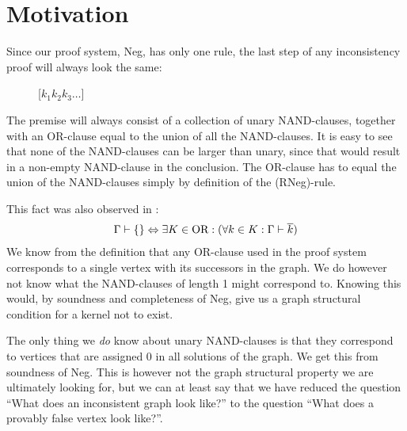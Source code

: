 \section{Motivation}
\label{sec:Motivation}
Since our proof system, Neg, has only one rule, the last step of any inconsistency proof will always look the same:\par
\begin{figure}[!h]
  \centering
  \begin{prooftree*}
    \Hypo{\dots}
    [$k_1k_2k_3\dots$]{\varnothing}
  \end{prooftree*}
  \caption{}
  \label{fig:proof_unary_nand}
\end{figure}
The premise will always consist of a collection of unary NAND-clauses, together with an OR-clause equal to the union of all the NAND-clauses.
It is easy to see that none of the NAND-clauses can be larger than unary, since that would result in a non-empty NAND-clause in the conclusion.
The OR-clause has to equal the union of the NAND-clauses simply by definition of the (RNeg)-rule.

This fact was also observed in \cite{michal-completeness}:
\begin{align}
  \Gamma \vdash \{\} \Leftrightarrow \exists K \in \text{OR}: (\forall  k \in K: \Gamma \vdash \ol{k})
\end{align}
We know from the definition that any OR-clause used in the proof system corresponds to a single vertex with its successors in the graph.
We do however not know what the NAND-clauses of length 1 might correspond to.
Knowing this would, by soundness and completeness of Neg, give us a graph structural condition for a kernel not to exist.

The only thing we \textit{do} know about unary NAND-clauses is that they correspond to vertices that are assigned 0 in all solutions of the graph.
We get this from soundness of Neg.
This is however not the graph structural property we are ultimately looking for, but we can at least say that we have reduced the question ``What does an inconsistent graph look like?'' to the question ``What does a provably false vertex look like?''.

